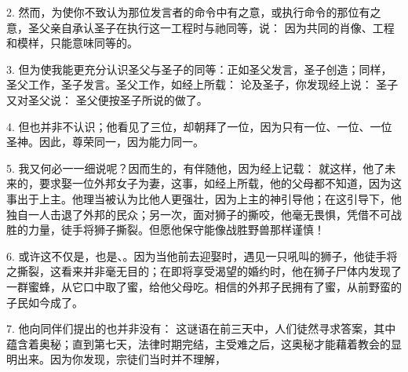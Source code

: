 2. 然而，为使你不致认为那位发言者的命令中有之意，或执行命令的那位有之意，圣父亲自承认圣子在执行这一工程时与祂同等，说： 因为共同的肖像、工程和模样，只能意味同等的。\par

3. 但为使我能更充分认识圣父与圣子的同等：正如圣父发言，圣子创造；同样，圣父工作，圣子发言。圣父工作，如经上所载： 论及圣子，你发现经上说： 圣子又对圣父说： 圣父便按圣子所说的做了。\par

4. 但也并非不认识；他看见了三位，却朝拜了一位，因为只有一位、一位、一位圣神。因此，尊荣同一，因为能力同一。\par

5. 我又何必一一细说呢？因而生的，有伴随他，因为经上记载： 就这样，他了未来的，要求娶一位外邦女子为妻，这事，如经上所载，他的父母都不知道，因为这事出于上主。他理当被认为比他人更强壮，因为上主的神引导他；在这引导下，他独自一人击退了外邦的民众；另一次，面对狮子的撕咬，他毫无畏惧，凭借不可战胜的力量，徒手将狮子撕裂。但愿他保守能像战胜野兽那样谨慎！\par

6. 或许这不仅是，也是、。因为当他前去迎娶时，遇见一只吼叫的狮子，他徒手将之撕裂，这看来并非毫无目的；在即将享受渴望的婚约时，他在狮子尸体内发现了一群蜜蜂，从它口中取了蜜，给他父母吃。相信的外邦子民拥有了蜜，从前野蛮的子民如今成了。\par

7. 他向同伴们提出的也并非没有： 这谜语在前三天中，人们徒然寻求答案，其中蕴含着奥秘；直到第七天，法律时期完结，主受难之后，这奥秘才能藉着教会的显明出来。因为你发现，宗徒们当时并不理解，\par

